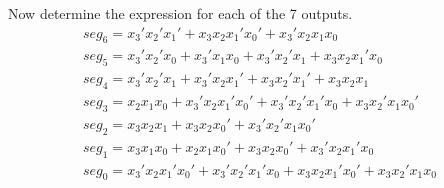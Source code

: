 \begin{enumerate}
\begin{onlysolution}
{                        Now determine the \SOPmin expression for each of the 7 outputs.
                        \begin{gather*}
                            seg_6 = x_3'x_2'x_1' + x_3x_2x_1'x_0' + x_3'x_2x_1x_0\\
                            seg_5 = x_3'x_2'x_0  + x_3'x_1x_0 + x_3'x_2'x_1 + x_3x_2x_1'x_0\\
                            seg_4 = x_3'x_2'x_1  + x_3'x_2x_1' + x_3x_2'x_1' + x_3x_2x_1\\
                            seg_3 = x_2x_1x_0    + x_3'x_2x_1'x_0' + x_3'x_2'x_1'x_0 + x_3x_2'x_1x_0'\\
                            seg_2 = x_3x_2x_1 + x_3x_2x_0' + x_3'x_2'x_1x_0' \\
                            seg_1 = x_3x_1x_0 + x_2x_1x_0' + x_3x_2x_0' + x_3'x_2x_1'x_0\\
                            seg_0 = x_3'x_2x_1'x_0' + x_3'x_2'x_1'x_0 + x_3x_2x_1'x_0' + x_3x_2'x_1x_0
                    \end{gather*} }
                \end{onlysolution}
        \end{enumerate}
